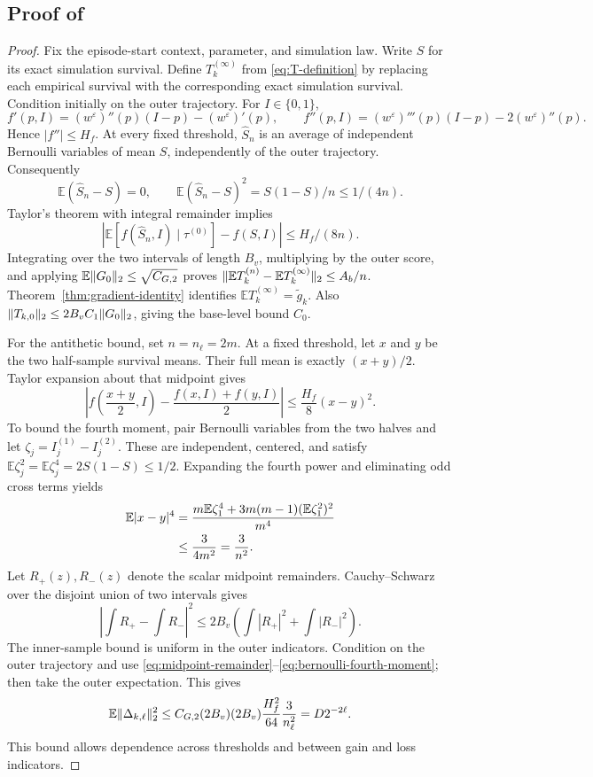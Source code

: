 \documentclass[11pt]{article}
\newcommand{\E}{\mathbb E}
\newcommand{\1}{\mathbf 1}
\DeclarePairedDelimiter{\norm}{\lVert}{\rVert}
\newcommand{\eps}{\varepsilon}
\begin{document}
\subsection{Proof of \texorpdfstring{}{the antithetic estimator proposition}}
\begin{proof}
Fix the episode-start context, parameter, and simulation law. Write $S$ for its exact simulation survival. Define $T_k^{(\infty)}$ from \eqref{eq:T-definition} by replacing each empirical survival with the corresponding exact simulation survival. Condition initially on the outer trajectory. For $I\in\{0,1\}$,
\[
 f'(p,I)=(w^\eps)''(p)(I-p)-(w^\eps)'(p),\qquad
 f''(p,I)=(w^\eps)'''(p)(I-p)-2(w^\eps)''(p).
\]
Hence $|f''|\le H_f$. At every fixed threshold, $\widehat S_n$ is an average of independent Bernoulli variables of mean $S$, independently of the outer trajectory. Consequently
\[
 \E(\widehat S_n-S)=0,\qquad
 \E(\widehat S_n-S)^2=S(1-S)/n\le1/(4n).
\]
Taylor's theorem with integral remainder implies
\[
 |\E[f(\widehat S_n,I)\mid\tau^{(0)}]-f(S,I)|
 \le H_f/(8n).
\]
Integrating over the two intervals of length $B_v$, multiplying by the outer score, and applying $\E\norm{G_0}_2\le\sqrt{C_{G,2}}$ proves
$\norm{\E T_k^{(n)}-\E T_k^{(\infty)}}_2\le A_b/n$.
Theorem~\ref{thm:gradient-identity} identifies $\E T_k^{(\infty)}=\widetilde g_k$. Also $\norm{T_{k,0}}_2\le2B_vC_1\norm{G_0}_2$, giving the base-level bound $C_0$.

For the antithetic bound, set $n=n_\ell=2m$. At a fixed threshold, let $x$ and $y$ be the two half-sample survival means. Their full mean is exactly $(x+y)/2$. Taylor expansion about that midpoint gives
\begin{equation}\label{eq:midpoint-remainder}
 \left|f\left(\frac{x+y}2,I\right)-\frac{f(x,I)+f(y,I)}2\right|
 \le\frac{H_f}{8}(x-y)^2.
\end{equation}
To bound the fourth moment, pair Bernoulli variables from the two halves and let $\zeta_j=I_j^{(1)}-I_j^{(2)}$. These are independent, centered, and satisfy
$\E \zeta_j^2=\E \zeta_j^4=2S(1-S)\le1/2$. Expanding the fourth power and eliminating odd cross terms yields
\begin{align}
 \E|x-y|^4
 &=\frac{m\E \zeta_1^4+3m(m-1)(\E \zeta_1^2)^2}{m^4}\notag\\
 &\le\frac{3}{4m^2}=\frac3{n^2}.
 \label{eq:bernoulli-fourth-moment}
\end{align}
Let $R_+(z),R_-(z)$ denote the scalar midpoint remainders. Cauchy--Schwarz over the disjoint union of two intervals gives
\[
 \left|\int R_+-\int R_-\right|^2
 \le2B_v\left(\int|R_+|^2+\int|R_-|^2\right).
\]
The inner-sample bound is uniform in the outer indicators. Condition on the outer trajectory and use \eqref{eq:midpoint-remainder}--\eqref{eq:bernoulli-fourth-moment}; then take the outer expectation. This gives
\[
 \E\norm{\Delta_{k,\ell}}_2^2
 \le C_{G,2}(2B_v)(2B_v)\frac{H_f^2}{64}\frac3{n_\ell^2}
 =D2^{-2\ell}.
\]
This bound allows dependence across thresholds and between gain and loss indicators.


\end{proof}
\end{document}
